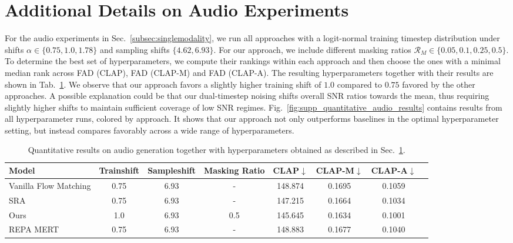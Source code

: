 \documentclass{article}
\theoremstyle{plain}
\theoremstyle{definition}
\theoremstyle{remark}
\begin{document}
\section{Additional Details on Audio Experiments}
\label{suppsec:audio}
For the audio experiments in Sec.~\ref{subsec:singlemodality}, we run all approaches with a logit-normal training timestep distribution under shifts $\alpha \in \{0.75, 1.0, 1.78\}$ and sampling shifts $\{4.62, 6.93\}$. For our approach, we include different masking ratios $\mathcal{R}_M \in \{0.05, 0.1, 0.25, 0.5\}$. To determine the best set of hyperparameters, we compute their rankings within each approach and then choose the ones with a minimal median rank across FAD (CLAP), FAD (CLAP-M) and FAD (CLAP-A). The resulting hyperparameters together with their results are shown in Tab.~\ref{tab:suppaudio}. We observe that our approach favors a slightly higher training shift of $1.0$ compared to $0.75$ favored by the other approaches. A possible explanation could be that our dual-timestep noising shifts overall SNR ratios towards the mean, thus requiring slightly higher shifts to maintain sufficient coverage of low SNR regimes. Fig.~\ref{fig:supp_quantitative_audio_results} contains results from all hyperparameter runs, colored by approach. It shows that our approach not only outperforms baselines in the optimal hyperparameter setting, but instead compares favorably across a wide range of hyperparameters.

\begin{table}[htbp]
    \caption{Quantitative results on audio generation together with hyperparameters obtained as described in Sec.~\ref{suppsec:audio}.}
\label{tab:suppaudio}
\centering
\small
\setlength{\tabcolsep}{5pt}
\begin{tabular}{@{}lccccccc@{}}
\toprule
    Model & Trainshift & Sampleshift & Masking Ratio & CLAP$\downarrow$ & CLAP-M$\downarrow$ & CLAP-A$\downarrow$ \\
\midrule
    Vanilla Flow Matching & 0.75 & 6.93 & - & 148.874 & 0.1695 & 0.1059 \\
    SRA & 0.75 & 6.93 & - & 147.215 & 0.1664 & 0.1034 \\
    Ours & 1.0 & 6.93 & 0.5 & 145.645 & 0.1634 & 0.1001 \\
    REPA MERT & 0.75 & 6.93 & - & 148.883 & 0.1677 & 0.1040 \\
\bottomrule
\end{tabular}
\end{table}
\end{document}
